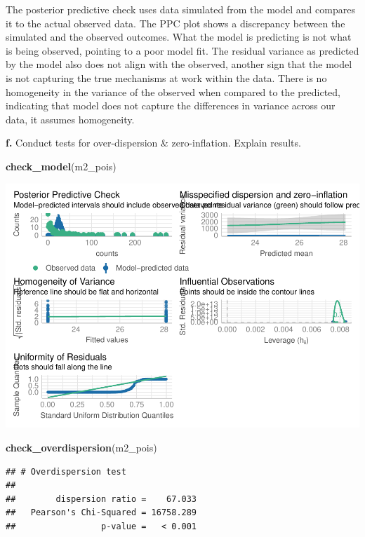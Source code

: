 \documentclass[
]{article}
\newenvironment{Shaded}{\begin{snugshade}}{\end{snugshade}}
\newcommand{\FunctionTok}[1]{\textcolor[rgb]{0.13,0.29,0.53}{\textbf{#1}}}
\newcommand{\NormalTok}[1]{#1}
\begin{document}
The posterior predictive check uses data simulated from the model and
compares it to the actual observed data. The PPC plot shows a
discrepancy between the simulated and the observed outcomes. What the
model is predicting is not what is being observed, pointing to a poor
model fit. The residual variance as predicted by the model also does not
align with the observed, another sign that the model is not capturing
the true mechanisms at work within the data. There is no homogeneity in
the variance of the observed when compared to the predicted, indicating
that model does not capture the differences in variance across our data,
it assumes homogeneity.

\textbf{f.} Conduct tests for over-dispersion \& zero-inflation. Explain
results.

\begin{Shaded}
\begin{Highlighting}[]
\FunctionTok{check\_model}\NormalTok{(m2\_pois)}
\end{Highlighting}
\end{Shaded}

\includegraphics{hw1-lobstrs-eds241_files/figure-latex/unnamed-chunk-20-1.pdf}

\begin{Shaded}
\begin{Highlighting}[]
\FunctionTok{check\_overdispersion}\NormalTok{(m2\_pois)}
\end{Highlighting}
\end{Shaded}

\begin{verbatim}
## # Overdispersion test
## 
##        dispersion ratio =    67.033
##   Pearson's Chi-Squared = 16758.289
##                 p-value =   < 0.001
\end{verbatim}
\end{document}
